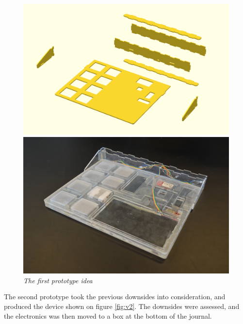 \begin{figure}[h]
\begin{minipage}[b]{7.5cm}
\centering
\includegraphics[scale=0.235]{figures/iterations/v1.png}
\end{minipage}
\begin{minipage}[b]{7.5cm}
\centering
\includegraphics[scale=0.58]{figures/iterations/v1-photo.jpg}
\end{minipage}
\caption{\small {\it {The first prototype idea}}} \label{fig:v1}
\end{figure}

The second prototype took the previous downsides into consideration, and produced the device shown on figure \ref{fig:v2}. The downsides were assessed, and the electronics was then moved to a box at the bottom of the journal. 

